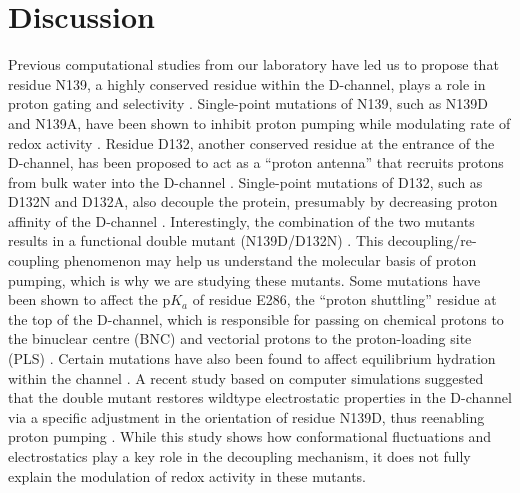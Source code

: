 \chapter{Discussion}

Previous computational studies from our laboratory have led us to propose that residue N139, a highly conserved residue within the D-channel, plays a role in proton gating and selectivity \cite{Henry:2009p4543,Henry:2011p10221}. Single-point mutations of N139, such as N139D and N139A, have been shown to inhibit proton pumping while modulating rate of redox activity \cite{Pawate:2002p5614,Namslauer:2003p6853}. Residue D132, another conserved residue at the entrance of the D-channel, has been proposed to act as a ``proton antenna'' that recruits protons from bulk water into the D-channel \cite{Mills:2000p4585,Henry:2009p4543}. Single-point mutations of D132, such as D132N and D132A, also decouple the protein, presumably by decreasing proton affinity of the D-channel \cite{Fetter:1996p5464,Henry:2011p10221}. Interestingly, the combination of the two mutants results in a functional double mutant (N139D/D132N) \cite{Branden:2006p9874}. This decoupling/re-coupling phenomenon may help us understand the molecular basis of proton pumping, which is why we are studying these mutants. Some mutations have been shown to affect the p$K_a$ of residue E286, the ``proton shuttling'' residue at the top of the D-channel, which is responsible for passing on chemical protons to the binuclear centre (BNC) and vectorial protons to the proton-loading site (PLS) \cite{Namslauer:2003p6853,Han:2006p5624,Branden:2006p9874,Fadda:2008p5482,Pisliakov:2008p7746,Lee:2010p8614}. Certain mutations have also been found to affect equilibrium hydration within the channel \cite{Tashiro:2005p7174,Sugitani:2009p5715,Henry:2009p4543}. A recent study based on computer simulations suggested that the double mutant restores wildtype electrostatic properties in the D-channel via a specific adjustment in the orientation of residue N139D, thus reenabling proton pumping \cite{Henry:2011p10221}. While this study shows how conformational fluctuations and electrostatics play a key role in the decoupling mechanism, it does not fully explain the modulation of redox activity in these mutants.

